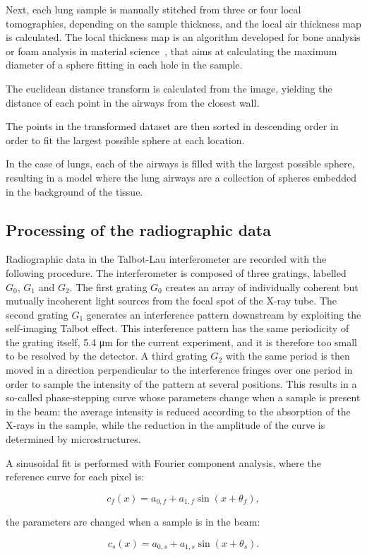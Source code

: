 
Next, each lung sample is manually stitched from three or four local
tomographies, depending on the sample thickness, and the local air thickness
map is calculated. The local thickness map is an algorithm developed for
bone analysis or foam analysis in material science~\cite{Hildebrand_2003}, that aims
at calculating the maximum diameter of a sphere fitting in each hole in the
sample.

The euclidean distance transform is calculated from the image, yielding the
distance of each point in the airways from the closest
wall.

The points in the transformed dataset are then sorted in descending order in
order to fit the largest possible sphere at each location.

In the case of lungs, each of the airways is filled with the largest possible
sphere, resulting in a model where the lung airways are a collection of
spheres embedded in the background of the tissue. 
\subsection{Processing of the radiographic data}\label{sec:radioprocessing}
Radiographic data in the Talbot-Lau interferometer are recorded with the
following procedure. The interferometer is composed of three gratings,
labelled $G_0$, $G_1$ and $G_2$. The first grating $G_0$ creates an array of
individually coherent but mutually incoherent light sources from the
focal spot of the X-ray tube. The second grating $G_1$ generates an
interference pattern downstream by exploiting the self-imaging Talbot
effect. This interference pattern has the same periodicity of the grating
itself, 5.4 μm for the current experiment, and it is therefore too small to
be resolved by the detector. A third grating $G_2$ with the same period is
then moved in a direction perpendicular to the interference fringes over one
period in order to sample the intensity of the pattern at several positions.
This results in a so-called phase-stepping curve whose parameters change
when a sample is present in the beam: the average intensity is reduced
according to the absorption of the X-rays in the sample, while the reduction
in the amplitude of the curve is determined by microstructures.

A sinusoidal fit is performed with Fourier component analysis, where the
reference curve for each pixel is:

\begin{equation}
    c_f(x) = a_{0,f} + a_{1,f} \sin(x + \theta_{f}),
    \label{eqn:flat}
\end{equation}

the parameters are changed when a sample is in the beam:

\begin{equation}
    c_s(x) = a_{0,s} + a_{1,s} \sin(x + \theta_{s}).
    \label{eqn:sample}
\end{equation}